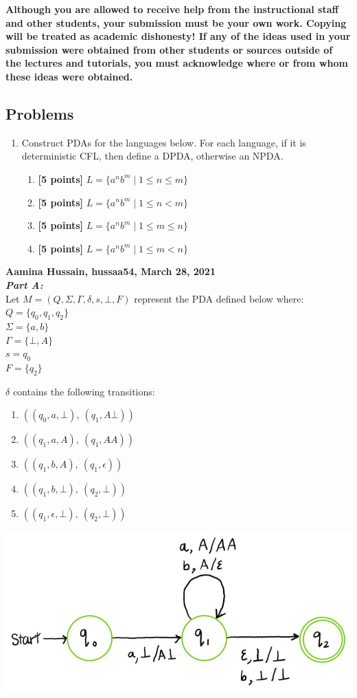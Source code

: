 \documentclass[11pt,fleqn]{article}
\newcommand{\be}{\begin{enumerate}}
\newcommand{\ee}{\end{enumerate}}
\newcommand{\set}[1]{{\{ #1 \}}}
\begin{document}
	\textbf{Although you are allowed to receive help from the
		instructional staff and other students, your submission must be your
		own work.  Copying will be treated as academic dishonesty! If any of
		the ideas used in your submission were obtained from other students
		or sources outside of the lectures and tutorials, you must
		acknowledge where or from whom these ideas were obtained.}
	
	\newpage
	
	\subsection*{Problems}
	
	\be
	
	\item  Construct PDAs for the languages below. For each language, if it is deterministic CFL, then define a DPDA, otherwise an NPDA.
	\be
	\item\textbf{[5 points]} $L = \{a^nb^m \mid 1 \le n \le m \}
$
	\item\textbf{[5 points]} $L = \{a^nb^m \mid 1 \le n < m \}$
	\item\textbf{[5 points]} $L = \{a^nb^m \mid 1 \le m \le n \}$
	\item\textbf{[5 points]} $L = \{a^nb^m \mid 1 \le m < n \}$ 
	\ee

	\ee
	\textbf{Aamina Hussain, hussaa54, March 28, 2021}\\
	
	\noindent\textbf{\emph{Part A:}}\\
	Let $M = (Q, \Sigma, \Gamma, \delta, s, \bot, F)$ represent the PDA defined below where:\\
	$Q = \set{q_0, q_1, q_2}$\\
	$\Sigma = \set{a, b}$\\
	$\Gamma = \set{\bot, A}$\\
	$s = q_0$\\
	$F = \set{q_2}$

	\noindent$\delta$ contains the following transitions:
	\be
	\item $((q_0, a, \bot),\ (q_1, A\bot))$
	\item $((q_1, a, A),\ (q_1, AA))$
	\item $((q_1, b, A),\ (q_1, \epsilon))$
	\item $((q_1, b, \bot),\ (q_2, \bot))$
	\item $((q_1, \epsilon, \bot),\ (q_2, \bot))$
	\ee

	\begin{center}
	\includegraphics[scale = 0.5]{A8partA.JPG}
	\end{center}
	
\end{document}
